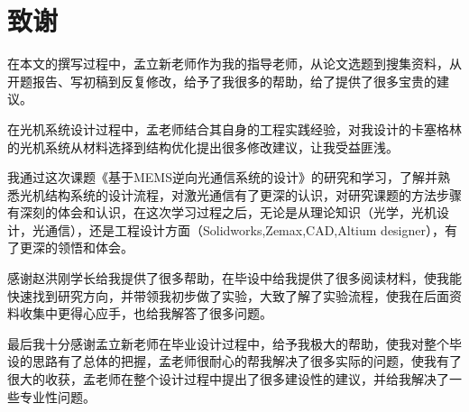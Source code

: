 \chapter[致谢]{致\quad 谢}%
\thispagestyle{noheaderstyle}%
\pagestyle{noheaderstyle}%
在本文的撰写过程中，孟立新老师作为我的指导老师，从论文选题到搜集资料，从开题报告、写初稿到反复修改，给予了我很多的帮助，给了提供了很多宝贵的建议。

在光机系统设计过程中，孟老师结合其自身的工程实践经验，对我设计的卡塞格林的光机系统从材料选择到结构优化提出很多修改建议，让我受益匪浅。

我通过这次课题《基于MEMS逆向光通信系统的设计》的研究和学习，了解并熟悉光机结构系统的设计流程，对激光通信有了更深的认识，对研究课题的方法步骤有深刻的体会和认识，在这次学习过程之后，无论是从理论知识（光学，光机设计，光通信），还是工程设计方面（Solidworks,Zemax,CAD,Altium designer），有了更深的领悟和体会。

感谢赵洪刚学长给我提供了很多帮助，在毕设中给我提供了很多阅读材料，使我能快速找到研究方向，并带领我初步做了实验，大致了解了实验流程，使我在后面资料收集中更得心应手，也给我解答了很多问题。

最后我十分感谢孟立新老师在毕业设计过程中，给予我极大的帮助，使我对整个毕设的思路有了总体的把握，孟老师很耐心的帮我解决了很多实际的问题，使我有了很大的收获，孟老师在整个设计过程中提出了很多建设性的建议，并给我解决了一些专业性问题。

